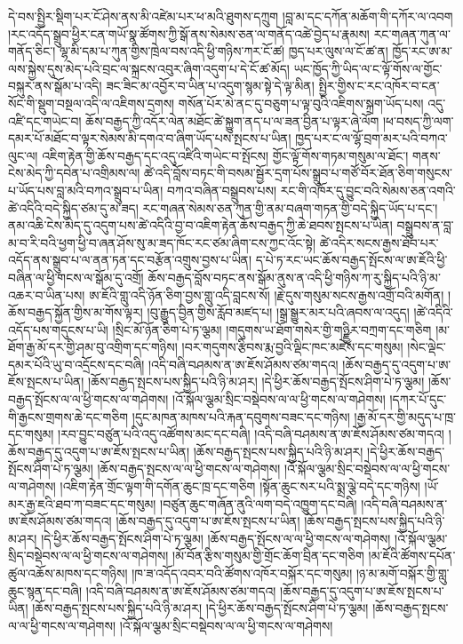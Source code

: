 \documentclass{article}
\begin{document}
དེ་བས་སྤྱིར་སྡིག་པར་ངོ་ཤེས་ནས་མི་འཛེམ་པར་ཕ་མའི་ཐུགས་དཀྲུག །བླ་མ་དང་དཀོན་མཆོག་གི་དཀོར་ལ་འབག །རང་འདོད་སྒྲུབ་ཕྱིར་ངན་གཡོ་སྣ་ཚོགས་ཀྱི་སྒོ་ནས་སེམས་ཅན་ལ་གནོད་འཚེ་བྱེད་པ་རྣམས། རང་གཞན་ཀུན་ལ་གནོད་ཅིང་། ལྷ་མི་དམ་པ་ཀུན་གྱིས་ཁྲེལ་བས་འདི་ཕྱི་གཉིས་ཀར་ངོ་ཚ། ཁྱད་པར་ལུས་ལ་ངོ་ཚ་ན། ཁྱོད་རང་ཨ་མ་ལས་སྐྱེས་དུས་མེད་པའི་བྲང་ལ་སྐྲངས་འབུར་ཞིག་འདུག་པ་དེ་ངོ་ཚ་མོད། ཡང་ཁྱོད་ཀྱི་ཡིད་ལ་ང་ལྟོ་གོས་ལ་གྱོང་བསྐུར་ནས་སྒོམ་པ་འདི། ཟང་ཟིང་མ་འབྱོར་བ་ཡིན་པ་འདུག་སྙམ་སྟེ་དེ་ལྟ་མིན། སྤྱིར་གྱིས་ང་རང་འཁོར་བ་ངན་སོང་གི་སྡུག་བསྔལ་འདི་ལ་འཇིགས་དྲགས། གསོན་པོར་མེ་ནང་དུ་བཅུག་པ་ལྟ་བུའི་འཇིགས་སྐྲག་ཡོད་པས། འདུ་འཛི་དང་གཡེང་བ། ཆོས་བརྒྱད་ཀྱི་འདོར་ལེན་མཐོང་ཚེ་སྐྱུག་ནད་པ་ལ་ཟན་བྱིན་པ་ལྟར་ཞེ་ལོག །ཕ་བསད་ཀྱི་ལག་དམར་པོ་མཐོང་བ་ལྟར་སེམས་མི་དགའ་བ་ཞིག་ཡོད་པས་སྤངས་པ་ཡིན། ཁྱད་པར་ང་ལ་ལྷོ་བྲག་མར་པའི་བཀའ་ལུང་ལ། འཇིག་རྟེན་གྱི་ཆོས་བརྒྱད་དང་འདུ་འཛིའི་གཡེང་བ་སྤོངས། གྱོང་ལྟོ་གོས་གཏམ་གསུམ་ལ་ཐོང་། གནས་ངེས་མེད་ཀྱི་དབེན་པ་འགྲིམས་ལ། ཚེ་འདི་བློས་བཏང་གི་བསམ་སྦྱོར་དྲག་པོས་སྒྲུབ་པ་གཙོ་བོར་ཐོན་ཅིག་གསུངས་པ་ཡོད་པས་བླ་མའི་བཀའ་སྒྲུབ་པ་ཡིན། བཀའ་བཞིན་བསྒྲུབས་པས། རང་གི་འཁོར་དུ་བྱུང་བའི་སེམས་ཅན་འགའི་ཚེ་འདིའི་བདེ་སྐྱིད་ཙམ་དུ་མ་ཟད། རང་གཞན་སེམས་ཅན་ཀུན་གྱི་ནམ་བཞག་གཏན་གྱི་བདེ་སྐྱིད་ཡོད་པ་དང་། ནམ་འཆི་ངེས་མེད་དུ་འདུག་པས་ཚེ་འདིའི་བྱ་བ་འཇིག་རྟེན་ཆོས་བརྒྱད་ཀྱི་ཆེ་ཐབས་སྤངས་པ་ཡིན། བསྒྲུབས་ན་བླ་མ་བ་རི་བའི་ཕྱག་ཕྱི་བ་ཞན་ཤོས་སུ་མ་ཟད་ཁོང་རང་ཙམ་ཞིག་ངས་ཀྱང་འོང་སྟེ། ཚེ་འདིར་སངས་རྒྱས་ཐོབ་པར་འདོད་ནས་སྒྲུབ་པ་ལ་ནན་ཏན་དང་བརྩོན་འགྲུས་བྱས་པ་ཡིན། ད་པེ་ཏ་རང་ཡང་ཆོས་བརྒྱད་སྤོངས་ལ་ཨ་ཇོའི་ཕྱི་བཞིན་ལ་ཕྱི་གངས་ལ་སྒོམ་དུ་འགྲོ། ཆོས་བརྒྱད་བློས་བཏང་ནས་སྒོམ་ནུས་ན་འདི་ཕྱི་གཉིས་ཀ་རུ་སྐྱིད་པའི་ཉི་མ་འཆར་བ་ཡིན་པས། ཨ་ཇོའི་གླུ་འདི་ཉོན་ཅིག་བྱས་གླུ་འདི་བླངས་སོ། །རྗེ་དུས་གསུམ་སངས་རྒྱས་འགྲོ་བའི་མགོན། །ཆོས་བརྒྱད་སྐྱོན་གྱིས་མ་གོས་ལྟར། །བུ་རྒྱུད་བྱིན་གྱིས་རློབ་མཛད་པ། །སྒྲ་སྒྱུར་མར་པའི་ཞབས་ལ་འདུད། །ཚེ་འདིའི་འདོད་པས་གདུངས་པ་ཡི། །སྲིང་མོ་ཉོན་ཅིག་པེ་ཏ་ལྕམ། །གདུགས་ཡ་ཐོག་གསེར་གྱི་གཉྫྱིར་བཀྲག་དང་གཅིག །མ་ཐོག་རྒྱ་མོ་དར་གྱི་ཤམ་བུ་འགྲིག་དང་གཉིས། །བར་གདུགས་རྩིབས་རྨ་བྱའི་ལྡིང་ཁང་མཛེས་དང་གསུམ། །སེང་ལྡེང་དམར་པོའི་ཡུ་བ་འདྲོངས་དང་བཞི། །འདི་བཞི་བཤམས་ན་ཨ་ཇོས་ཤོམས་ཙམ་གདའ། །ཆོས་བརྒྱད་དུ་འདུག་པ་ཨ་ཇོས་སྤངས་པ་ཡིན། །ཆོས་བརྒྱད་སྤངས་པས་སྐྱིད་པའི་ཉི་མ་ཤར། །དེ་ཕྱིར་ཆོས་བརྒྱད་སྤོངས་ཤིག་པེ་ཏ་ལྕམ། །ཆོས་བརྒྱད་སྤོངས་ལ་ལ་ཕྱི་གངས་ལ་གཤེགས། །འོ་སྐོལ་ལྕམ་སྲིང་བསྡེབས་ལ་ལ་ཕྱི་གངས་ལ་གཤེགས། །དཀར་པོ་དུང་གི་རྒྱངས་གྲགས་ཆེ་དང་གཅིག །དུང་མཁན་མཁས་པའི་རྐན་དབུགས་བཟང་དང་གཉིས། །རྒྱ་མོ་དར་གྱི་མདུད་པ་ཁྲ་དང་གསུམ། །རབ་བྱུང་བཙུན་པའི་འདུ་འཚོགས་མང་དང་བཞི། །འདི་བཞི་བཤམས་ན་ཨ་ཇོས་ཤོམས་ཙམ་གདའ། །ཆོས་བརྒྱད་དུ་འདུག་པ་ཨ་ཇོས་སྤངས་པ་ཡིན། །ཆོས་བརྒྱད་སྤངས་པས་སྐྱིད་པའི་ཉི་མ་ཤར། །དེ་ཕྱིར་ཆོས་བརྒྱད་སྤོངས་ཤིག་པེ་ཏ་ལྕམ། །ཆོས་བརྒྱད་སྤངས་ལ་ལ་ཕྱི་གངས་ལ་གཤེགས། །འོ་སྐོལ་ལྕམ་སྲིང་བསྡེབས་ལ་ལ་ཕྱི་གངས་ལ་གཤེགས། །འཇིག་རྟེན་གྲོང་ལྟག་གི་དགོན་ཆུང་ཁྲ་དང་གཅིག །སྟོན་ཆུང་སར་པའི་སྨྲ་ལྕེ་བདེ་དང་གཉིས། །ཡོ་མར་རྒྱ་ཇའི་ཐབ་ཀ་བཟང་དང་གསུམ། །བཙུན་ཆུང་གཞོན་ནུའི་ལག་བདེ་འཁྱུག་དང་བཞི། །འདི་བཞི་བཤམས་ན་ཨ་ཇོས་ཤོམས་ཙམ་གདའ། །ཆོས་བརྒྱད་དུ་འདུག་པ་ཨ་ཇོས་སྤངས་པ་ཡིན། །ཆོས་བརྒྱད་སྤངས་པས་སྐྱིད་པའི་ཉི་མ་ཤར། །དེ་ཕྱིར་ཆོས་བརྒྱད་སྤོངས་ཤིག་པེ་ཏ་ལྕམ། །ཆོས་བརྒྱད་སྤོངས་ལ་ལ་ཕྱི་གངས་ལ་གཤེགས། །འོ་སྐོལ་ལྕམ་སྲིད་བསྡེབས་ལ་ལ་ཕྱི་གངས་ལ་གཤེགས། །མོ་བོན་རྩིས་གསུམ་གྱི་གྲོང་ཆོག་བྲིན་དང་གཅིག །མ་ཇོའི་ཚོགས་དཔོན་ཚུལ་འཆོས་མཁས་དང་གཉིས། །ཁ་ཟ་འདོད་འབར་བའི་ཚོགས་འཁོར་བསྐོར་དང་གསུམ། །ཉ་མ་མགོ་བསྐོར་གྱི་གླུ་ཆུང་སྙན་དང་བཞི། །འདི་བཞི་བཤམས་ན་ཨ་ཇོས་ཤོམས་ཙམ་གདའ། །ཆོས་བརྒྱད་དུ་འདུག་པ་ཨ་ཇོས་སྤངས་པ་ཡིན། །ཆོས་བརྒྱད་སྤངས་པས་སྐྱིད་པའི་ཉི་མ་ཤར། །དེ་ཕྱིར་ཆོས་བརྒྱད་སྤོངས་ཤིག་པེ་ཏ་ལྕམ། །ཆོས་བརྒྱད་སྤངས་ལ་ལ་ཕྱི་གངས་ལ་གཤེགས། །འོ་སྐོལ་ལྕམ་སྲིང་བསྡེབས་ལ་ལ་ཕྱི་གངས་ལ་གཤེགས། 
\end{document}

